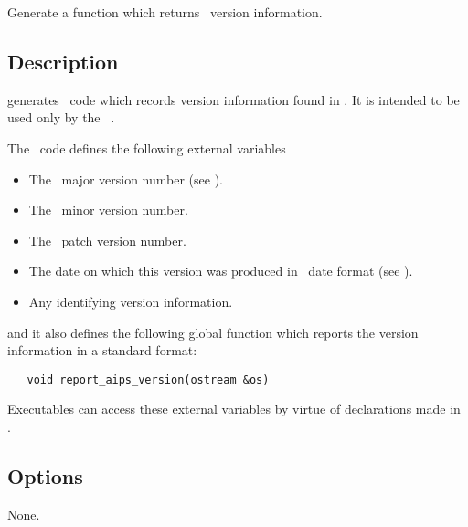 Generate a function which returns \aipspp\ version information.

\begin{synopsis}
\end{synopsis}
 
\subsection*{Description}
 
 generates \cplusplus\ code which records version information
found in .  It is intended to be used only by the
\aipspp\ .

The \cplusplus\ code defines the following external variables

\begin{itemize}
\item
    The \aipspp\ major version number
   (see ).

\item
    The \aipspp\ minor version number.

\item
    The \aipspp\ patch version number.

\item
    The date on which this version was
   produced in \aipspp\ date format (see ).

\item
    Any identifying version
   information.
\end{itemize}
 
\noindent
and it also defines the following global function which reports the version
information in a standard format:

\begin{verbatim}
   void report_aips_version(ostream &os)
\end{verbatim}

\noindent
Executables can access these external variables by virtue of declarations
made in .

\subsection*{Options}
 
None.
 
